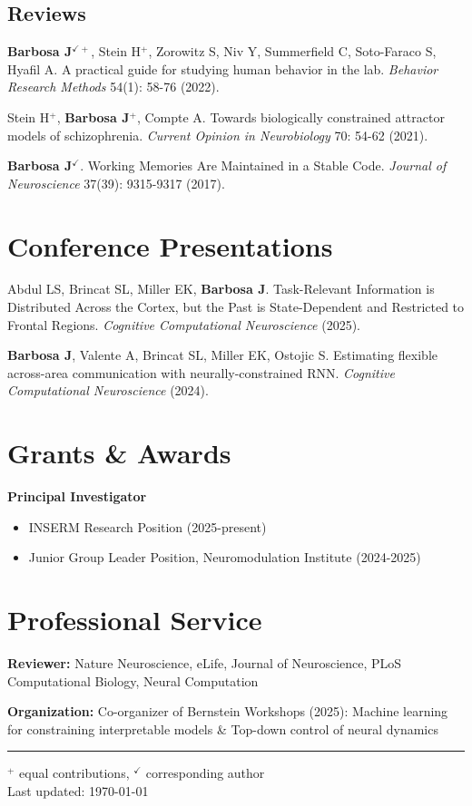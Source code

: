 \documentclass[11pt,a4paper]{article}
\begin{document}
\subsection{Reviews}

\textbf{Barbosa J}$^{\checkmark+}$, Stein H$^{+}$, Zorowitz S, Niv Y, Summerfield C, Soto-Faraco S, Hyafil A. A practical guide for studying human behavior in the lab. \textit{Behavior Research Methods} 54(1): 58-76 (2022).

Stein H$^{+}$, \textbf{Barbosa J}$^{+}$, Compte A. Towards biologically constrained attractor models of schizophrenia. \textit{Current Opinion in Neurobiology} 70: 54-62 (2021).

\textbf{Barbosa J}$^{\checkmark}$. Working Memories Are Maintained in a Stable Code. \textit{Journal of Neuroscience} 37(39): 9315-9317 (2017).

\section{Conference Presentations}

Abdul LS, Brincat SL, Miller EK, \textbf{Barbosa J}. Task-Relevant Information is Distributed Across the Cortex, but the Past is State-Dependent and Restricted to Frontal Regions. \textit{Cognitive Computational Neuroscience} (2025).

\textbf{Barbosa J}, Valente A, Brincat SL, Miller EK, Ostojic S. Estimating flexible across-area communication with neurally-constrained RNN. \textit{Cognitive Computational Neuroscience} (2024).

\section{Grants \& Awards}

\textbf{Principal Investigator}
\begin{itemize}
\item INSERM Research Position (2025-present)
\item Junior Group Leader Position, Neuromodulation Institute (2024-2025)
\end{itemize}

\section{Professional Service}

\textbf{Reviewer:} Nature Neuroscience, eLife, Journal of Neuroscience, PLoS Computational Biology, Neural Computation

\textbf{Organization:} Co-organizer of Bernstein Workshops (2025): Machine learning for constraining interpretable models \& Top-down control of neural dynamics

\vspace{12pt}
\hrule
\vspace{6pt}

\footnotesize
$^{+}$ equal contributions, $^{\checkmark}$ corresponding author\\
Last updated: \today
\end{document}
